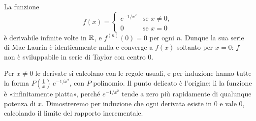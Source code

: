 \begin{proposizione}\label{prop:cauchy-controesempio}
La funzione
\begin{equation}\label{eq:cauchy-controesempio}
  f(x)=\begin{cases} e^{-1/x^{2}} & \text{se } x\neq0,\\ 0 & \text{se } x=0 \end{cases}
\end{equation}
è derivabile infinite volte in $\mathbb{R}$, e $f^{(n)}(0)=0$ per ogni $n$. Dunque la sua serie di
Mac Laurin è identicamente nulla e converge a $f(x)$ soltanto per $x=0$: $f$ non è
sviluppabile in serie di Taylor con centro $0$.
\end{proposizione}

\begin{schema}
\end{schema}

\begin{strategia}
Per $x\neq0$ le derivate si calcolano con le regole usuali, e per induzione hanno tutte
la forma $P(\frac1x)\,e^{-1/x^{2}}$, con $P$ polinomio. Il punto delicato è l'origine: lì la
funzione è «infinitamente piatta», perché $e^{-1/x^{2}}$ tende a zero più rapidamente di
qualunque potenza di $x$. Dimostreremo per induzione che ogni derivata esiste in $0$ e
vale $0$, calcolando il limite del rapporto incrementale.
\end{strategia}

